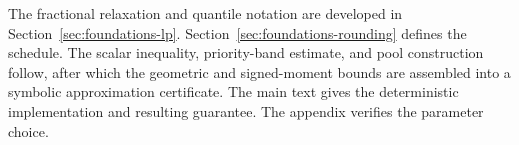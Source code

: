 The fractional relaxation and quantile notation are developed in
Section~\ref{sec:foundations-lp}. Section~\ref{sec:foundations-rounding}
defines the schedule. The scalar inequality, priority-band estimate, and
pool construction follow, after which the geometric and signed-moment
bounds are assembled into a symbolic approximation certificate. The main
text gives the deterministic implementation and resulting guarantee. The
appendix verifies the parameter choice.

